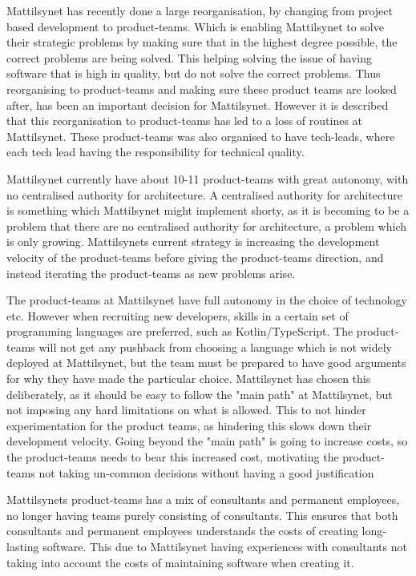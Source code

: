 Mattilsynet has recently done a large reorganisation, by changing from project based development to product-teams. Which is enabling Mattilsynet to solve their strategic problems by making sure that in the highest degree possible, the correct problems are being solved. This helping solving the issue of having software that is high in quality, but do not solve the correct problems. Thus reorganising to product-teams and making sure these product teams are looked after, has been an important decision for Mattilsynet. However it is described that this reorganisation to product-teams has led to a loss of routines at Mattilsynet. These product-teams was also organised to have tech-leads, where each tech lead having the responsibility for technical quality.

Mattilsynet currently have about 10-11 product-teams with great autonomy, with no centralised authority for architecture. A centralised authority for architecture is something which Mattilsynet might implement shorty, as it is becoming to be a problem that there are no centralised authority for architecture, a problem which is only growing. Mattilsynets current strategy is increasing the development velocity of the product-teams before giving the product-teams direction, and instead iterating the product-teams as new problems arise.

The product-teams at Mattilsynet have full autonomy in the choice of technology etc. However when recruiting new developers, skills in a certain set of programming languages are preferred, such as Kotlin/TypeScript. The product-teams will not get any pushback from choosing a language which is not widely deployed at Mattilsynet, but the team must be prepared to have good arguments for why they have made the particular choice. Mattilsynet has chosen this deliberately, as it should be easy to follow the "main path" at Mattilsynet, but not imposing any hard limitations on what is allowed. This to not hinder experimentation for the product teams, as hindering this slows down their development velocity. Going beyond the "main path" is going to increase costs, so the product-teams needs to bear this increased cost, motivating the product-teams not taking un-common decisions without having a good justification

Mattilsynets product-teams has a mix of consultants and permanent employees, no longer having teams purely consisting of consultants. This ensures that both consultants and permanent employees understands the costs of creating long-lasting software. This due to Mattilsynet having experiences with consultants not taking into account the costs of maintaining software when creating it.

